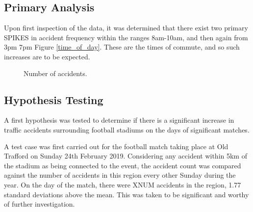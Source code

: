 \documentclass[12pt]{article}
\begin{document}
\subsection{Primary Analysis}

Upon first inspection of the data, it was determined that there exist two primary SPIKES in accident frequency within the ranges 8am-10am, and then again from 3pm 7pm Figure \ref{time_of_day}. These are the times of commute, and so such increases are to be expected.

\begin{figure}[h]
\centering     %
{}
\caption{Number of accidents.}
\end{figure}


\subsection{Hypothesis Testing}

A first hypothesis was tested to determine if there is a significant increase in traffic accidents surrounding football stadiums on the days of significant matches.

A test case was first carried out for the football match taking place at Old Trafford on Sunday 24th February 2019. Considering any accident within 5km of the stadium as being connected to the event, the accident count was compared against the number of accidents in this region every other Sunday during the year. On the day of the match, there were XNUM accidents in the region, 1.77 standard deviations above the mean. This was taken to be significant and worthy of further investigation.
\end{document}

